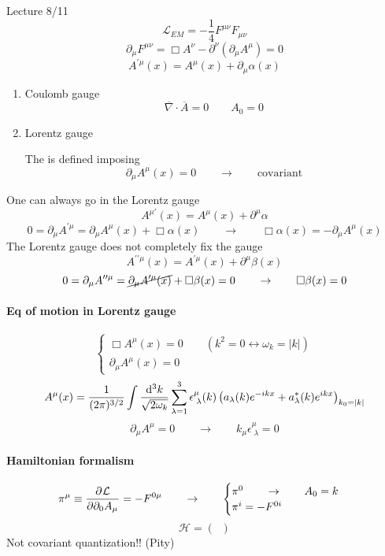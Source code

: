 Lecture 8/11
\[ \mathcal{L}_{EM} = - \frac{1}{4}F^{\mu\nu}F_{\mu\nu} \]
\[ \partial_\mu F^{\mu\nu} = \Box A^\nu - \partial^\nu \left(\partial_\mu A^\mu\right) = 0 \]
\[ A^{\prime\mu}(x) = A^\mu(x) + \partial_\mu\alpha(x) \]
\begin{enumerate}
\item Coulomb gauge
\[ \overline{\nabla}\cdot\overline{A}=0 \qquad A_0 = 0 \]
\item Lorentz gauge
\begin{definition}
The  is defined imposing
\[ \partial_\mu A^\mu(x) = 0 \qquad \to \qquad \text{covariant} \]
\end{definition}
\end{enumerate}
One can always go in the Lorentz gauge
\[ A^{\mu\prime}(x) = A^\mu(x) + \partial^\mu\alpha \]
\[ 0=\partial_\mu A^{\prime\mu} = \partial_\mu A^\mu(x) + \Box\alpha(x) \qquad \to \qquad\Box\alpha(x) = -\partial_\mu A^\mu(x) \]
The Lorentz gauge does not completely fix the gauge
\[ A^{\prime\prime\mu}(x) = A^{\prime\mu}(x) + \partial^\mu\beta(x) \]
\[ 0= \partial_\mu A^{\prime\prime\mu} = \cancel{\partial_\mu A^{\prime\mu}(x)} + \Box\beta(x) = 0 \qquad \to \qquad\Box\beta(x) = 0 \]

\paragraph{Eq of motion in Lorentz gauge}
\[ \begin{cases}
\Box A^\mu(x) = 0 \qquad \left(k^2=0\leftrightarrow\omega_k=|k|\right)\\ \partial_\mu A^\mu(x) = 0
\end{cases} \]
\[ A^\mu(x) = \frac{1}{(2\pi)^{3/2}}\int \frac{\operatorname{d \!}{^3k}}{\sqrt{2\omega_k}}\sum^3_{\lambda=1}\epsilon^\mu_{\;\lambda}(k)\left(a_\lambda(k)e^{-ikx}+a^*_\lambda(k)e^{ikx}\right)_{k_0=|k|} \]
\[ \partial_\mu A^\mu = 0 \qquad \to \qquad k_\mu\epsilon^\mu_{\;\lambda} = 0 \]

\paragraph{Hamiltonian formalism}
\[ \pi^\mu \equiv  \frac{\partial{^{}}\mathcal{L}}{\partial{{\partial_0A_\mu}^{}}}  = - F^{0\mu} \qquad \to \qquad \begin{cases}
\pi^0 \qquad \to \qquad A_0 = k \\ \pi^i = -F^{0i}
\end{cases} \]
\[ \mathcal{H} = \left(\;\;\right) \]
Not covariant quantization!! (Pity)

